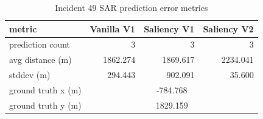 \begin{table}[ht]
\centering
\caption{Incident 49 SAR prediction error metrics}
\label{tab:sar-incident-49}
\begin{tabular}{lrrr}
\hline
metric & Vanilla V1 & Saliency V1 & Saliency V2 \\
\hline
prediction count & 3 & 3 & 3 \\
avg distance (m) & 1862.274 & 1869.617 & 2234.041 \\
stddev (m) & 294.443 & 902.091 & 35.600 \\
ground truth x (m) & \multicolumn{3}{c}{-784.768} \\
ground truth y (m) & \multicolumn{3}{c}{1829.159} \\
\hline
\end{tabular}
\end{table}
